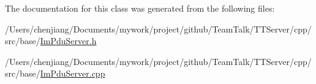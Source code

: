 The documentation for this class was generated from the following files\+:\begin{DoxyCompactItemize}
\item 
/\+Users/chenjiang/\+Documents/mywork/project/github/\+Team\+Talk/\+T\+T\+Server/cpp/src/base/\hyperlink{_im_pdu_server_8h}{Im\+Pdu\+Server.\+h}\item 
/\+Users/chenjiang/\+Documents/mywork/project/github/\+Team\+Talk/\+T\+T\+Server/cpp/src/base/\hyperlink{_im_pdu_server_8cpp}{Im\+Pdu\+Server.\+cpp}\end{DoxyCompactItemize}
